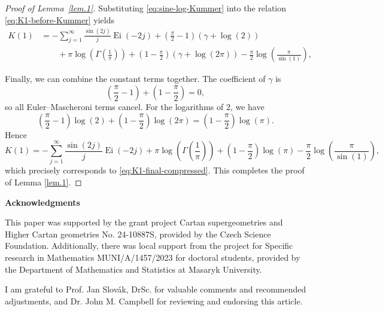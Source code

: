 \documentclass[preprint,12pt,nopreprintline]{elsarticle}
\begin{document}
\begin{proof}[Proof of Lemma~\ref{lem.1}]
Substituting \eqref{eq:sine-log-Kummer} into the relation \eqref{eq:K1-before-Kummer} yields
\begin{align}
K(1)
&=
-\sum_{j=1}^{\infty}\frac{\sin(2j)}{j}\operatorname{Ei}(-2j)
+\left(\frac{\pi}{2}-1\right)(\gamma+\log \left(2\right))
\nonumber\\
&\qquad
+\pi\log\left(\Gamma\!\left(\frac{1}{\pi}\right)\right)
+\left(1-\frac{\pi}{2}\right)(\gamma+\log(2\pi))
-\frac{\pi}{2}\log\!\left(\frac{\pi}{\sin \left(1\right)}\right),
\end{align}

Finally, we can combine the constant terms together. The coefficient of $\gamma$ is
\begin{equation}
\left(\frac{\pi}{2}-1\right)+\left(1-\frac{\pi}{2}\right)=0,
\end{equation}
so all Euler--Mascheroni terms cancel. For the logarithms of $2$, we have
\begin{equation}
\left(\frac{\pi}{2}-1\right)\log \left
(2\right)
+
\left(1-\frac{\pi}{2}\right)\log(2\pi)
=
\left(1-\frac{\pi}{2}\right)\log\left(\pi\right).
\end{equation}
Hence
\[
K(1)
=
-\sum_{j=1}^{\infty}\frac{\sin(2j)}{j}\operatorname{Ei}(-2j)
+\pi\log\left(\Gamma\!\left(\frac{1}{\pi}\right)\right)
+\left(1-\frac{\pi}{2}\right)\log\left(\pi\right)
-\frac{\pi}{2}\log\!\left(\frac{\pi}{\sin \left(1\right)}\right),
\]
which precisely corresponds to \eqref{eq:K1-final-compressed}. This completes the proof of Lemma \ref{lem.1}.
\end{proof}

\newpage
\vspace{1cm}
\hspace{-0.6cm}\textbf{Acknowledgments}

\vspace{0.1cm}
This paper was supported by the grant project Cartan supergeometries and Higher Cartan geometries No. 24-10887S, provided by the Czech Science Foundation. Additionally, there was local support from the project for Specific research in Mathematics MUNI/A/1457/2023 for doctoral students, provided by the Department of Mathematics and Statistics at Masaryk University.

I am grateful to Prof. Jan Slovák, DrSc. for valuable comments and recommended adjustments, and Dr. John M. Campbell for reviewing and endorsing this article. 

  
 
\end{document}
